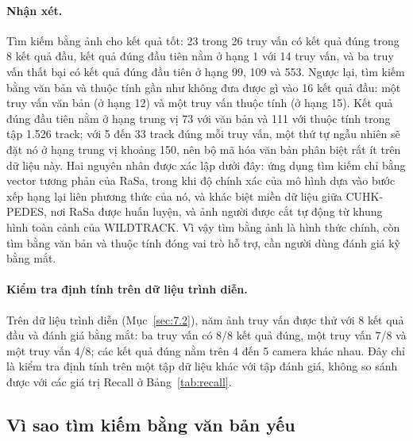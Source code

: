 \paragraph{Nhận xét.} Tìm kiếm bằng ảnh cho kết quả tốt: 23 trong 26 truy vấn có kết quả đúng trong 8 kết quả đầu, kết quả đúng đầu tiên nằm ở hạng 1 với 14 truy vấn, và ba truy vấn thất bại có kết quả đúng đầu tiên ở hạng 99, 109 và 553. Ngược lại, tìm kiếm bằng văn bản và thuộc tính gần như không đưa được gì vào 16 kết quả đầu: một truy vấn văn bản (ở hạng 12) và một truy vấn thuộc tính (ở hạng 15). Kết quả đúng đầu tiên nằm ở hạng trung vị 73 với văn bản và 111 với thuộc tính trong tập 1.526 track; với 5 đến 33 track đúng mỗi truy vấn, một thứ tự ngẫu nhiên sẽ đặt nó ở hạng trung vị khoảng 150, nên bộ mã hóa văn bản phân biệt rất ít trên dữ liệu này. Hai nguyên nhân được xác lập dưới đây: ứng dụng tìm kiếm chỉ bằng vector tương phản của RaSa, trong khi độ chính xác của mô hình dựa vào bước xếp hạng lại liên phương thức của nó, và khác biệt miền dữ liệu giữa CUHK-PEDES, nơi RaSa được huấn luyện, và ảnh người được cắt tự động từ khung hình toàn cảnh của WILDTRACK. Vì vậy tìm bằng ảnh là hình thức chính, còn tìm bằng văn bản và thuộc tính đóng vai trò hỗ trợ, cần người dùng đánh giá kỹ bằng mắt.

\paragraph{Kiểm tra định tính trên dữ liệu trình diễn.} Trên dữ liệu trình diễn (Mục~\ref{sec:7.2}), năm ảnh truy vấn được thử với 8 kết quả đầu và đánh giá bằng mắt: ba truy vấn có 8/8 kết quả đúng, một truy vấn 7/8 và một truy vấn 4/8; các kết quả đúng nằm trên 4 đến 5 camera khác nhau. Đây chỉ là kiểm tra định tính trên một tập dữ liệu khác với tập đánh giá, không so sánh được với các giá trị Recall ở Bảng~\ref{tab:recall}.

\subsection{Vì sao tìm kiếm bằng văn bản yếu}

